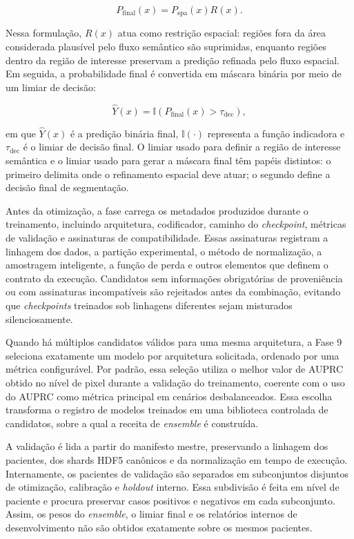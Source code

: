 \begin{equation}\label{eq:two-stream-gated-ensemble}
    P_{\mathrm{final}}(x)
    =
    P_{\mathrm{spa}}(x)R(x).
\end{equation}

Nessa formulação, $R(x)$ atua como restrição espacial: regiões fora da área
considerada plausível pelo fluxo semântico são suprimidas, enquanto regiões
dentro da região de interesse preservam a predição refinada pelo fluxo espacial.
Em seguida, a probabilidade final é convertida em máscara binária por meio de um
limiar de decisão:

\begin{equation}\label{eq:ensemble-decision-threshold}
    \hat{Y}(x)
    =
    \mathbb{I}\left(P_{\mathrm{final}}(x)>\tau_{\mathrm{dec}}\right),
\end{equation}

em que $\hat{Y}(x)$ é a predição binária final, $\mathbb{I}(\cdot)$ representa a
função indicadora e $\tau_{\mathrm{dec}}$ é o limiar de decisão final. O limiar
usado para definir a região de interesse semântica e o limiar usado para gerar a
máscara final têm papéis distintos: o primeiro delimita onde o refinamento
espacial deve atuar; o segundo define a decisão final de segmentação.

Antes da otimização, a fase carrega os metadados produzidos durante o
treinamento, incluindo arquitetura, codificador, caminho do \textit{checkpoint},
métricas de validação e assinaturas de compatibilidade. Essas assinaturas
registram a linhagem dos dados, a partição experimental, o método de
normalização, a amostragem inteligente, a função de perda e outros elementos que
definem o contrato da execução. Candidatos sem informações obrigatórias de
proveniência ou com assinaturas incompatíveis são rejeitados antes da combinação,
evitando que \textit{checkpoints} treinados sob linhagens diferentes sejam
misturados silenciosamente.

Quando há múltiplos candidatos válidos para uma mesma arquitetura, a Fase 9
seleciona exatamente um modelo por arquitetura solicitada, ordenado por uma
métrica configurável. Por padrão, essa seleção utiliza o melhor valor de AUPRC
obtido no nível de pixel durante a validação do treinamento, coerente com o uso
do AUPRC como métrica principal em cenários desbalanceados. Essa escolha
transforma o registro de modelos treinados em uma biblioteca controlada de
candidatos, sobre a qual a receita de \textit{ensemble} é construída.

A validação é lida a partir do manifesto mestre, preservando a linhagem dos
pacientes, dos shards HDF5 canônicos e da normalização em tempo de execução.
Internamente, os pacientes de validação são separados em subconjuntos disjuntos
de otimização, calibração e \textit{holdout} interno. Essa
subdivisão é feita em nível de paciente e procura preservar casos positivos e
negativos em cada subconjunto. Assim, os pesos do \textit{ensemble}, o limiar
final e os relatórios internos de desenvolvimento não são obtidos exatamente
sobre os mesmos pacientes.

